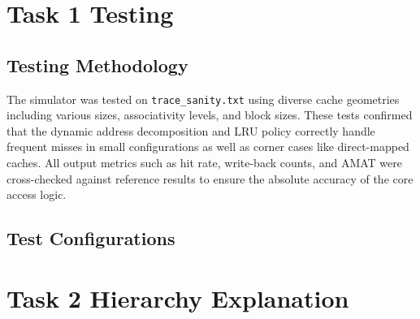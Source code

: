\documentclass[11pt]{article}
\begin{document}
\section{Task 1 Testing}
\subsection{Testing Methodology}
The simulator was tested on \texttt{trace\_sanity.txt} using diverse cache geometries including various sizes, associativity levels, and block sizes. These tests confirmed that the dynamic address decomposition and LRU policy correctly handle frequent misses in small configurations as well as corner cases like direct-mapped caches. All output metrics such as hit rate, write-back counts, and AMAT were cross-checked against reference results to ensure the absolute accuracy of the core access logic.
\subsection{Test Configurations}

\begin{table}[h!]
\centering
{}
\end{table}

\section{Task 2 Hierarchy Explanation}
\end{document}
